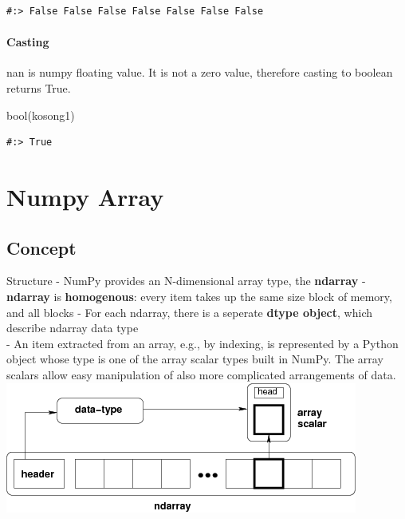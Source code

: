 \documentclass[
]{book}
\newenvironment{Shaded}{\begin{snugshade}}{\end{snugshade}}
\newcommand{\BuiltInTok}[1]{#1}
\newcommand{\NormalTok}[1]{#1}
\begin{document}
\begin{verbatim}
#:> False False False False False False False
\end{verbatim}

\hypertarget{casting}{%
\paragraph{Casting}\label{casting}}

nan is numpy floating value. It is not a zero value, therefore casting to boolean returns True.

\begin{Shaded}
\begin{Highlighting}[]
\BuiltInTok{bool}\NormalTok{(kosong1)}
\end{Highlighting}
\end{Shaded}

\begin{verbatim}
#:> True
\end{verbatim}

\hypertarget{numpy-array}{%
\section{Numpy Array}\label{numpy-array}}

\hypertarget{concept}{%
\subsection{Concept}\label{concept}}

Structure - NumPy provides an N-dimensional array type, the \textbf{ndarray} - \textbf{ndarray} is \textbf{homogenous}: every item takes up the same size block of memory, and all blocks - For each ndarray, there is a seperate \textbf{dtype object}, which describe ndarray data type\\
- An item extracted from an array, e.g., by indexing, is represented by a Python object whose type is one of the array scalar types built in NumPy. The array scalars allow easy manipulation of also more complicated arrangements of data. \includegraphics{./img/numpy.png}
\end{document}

